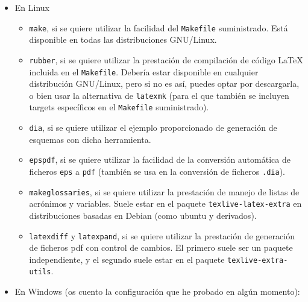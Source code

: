 \begin{itemize}
\item En Linux

  \begin{itemize}
  \item \texttt{make}, si se quiere utilizar la facilidad del
    \texttt{Makefile} suministrado. Está disponible en todas las
    distribuciones GNU/Linux.
  \item \texttt{rubber}, si se quiere utilizar la prestación de
    compilación de código \LaTeX{} incluida en el
    \texttt{Makefile}. Debería estar disponible en cualquier distribución
    GNU/Linux, pero si no es así, puedes optar por descargarla, o bien
    usar la alternativa de \texttt{latexmk} (para el que también se
    incluyen targets específicos en el \texttt{Makefile} suministrado).
  \item \texttt{dia}, si se quiere utilizar el ejemplo proporcionado de
    generación de esquemas con dicha herramienta.
  \item \texttt{epspdf}, si se quiere utilizar la facilidad de la
    conversión automática de ficheros \texttt{eps} a \texttt{pdf} (también
    se usa en la conversión de ficheros \texttt{.dia}).
  \item \texttt{makeglossaries}, si se quiere utilizar la prestación de
    manejo de listas de acrónimos y variables. Suele estar en el paquete
    \texttt{texlive-latex-extra} en distribuciones basadas en Debian
    (como ubuntu y derivados).
  \item \texttt{latexdiff} y \texttt{latexpand}, si se quiere utilizar la
    prestación de generación de ficheros pdf con control de cambios. El
    primero suele ser un paquete independiente, y el segundo suele estar
    en el paquete \texttt{texlive-extra-utils}.
  \end{itemize}

\item En Windows (os cuento la configuración que he probado en algún momento):


\end{itemize}
